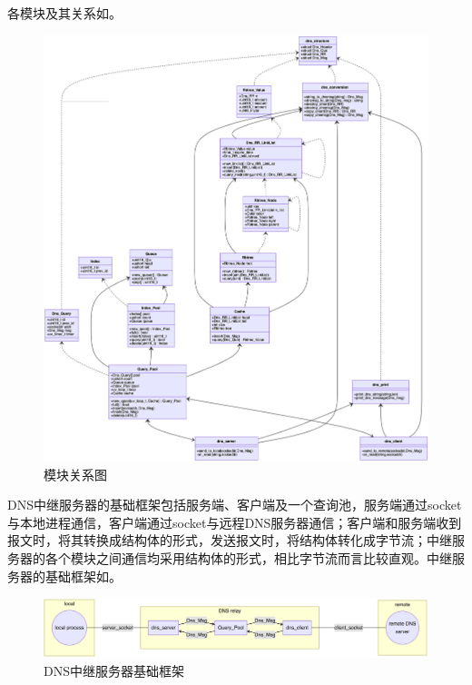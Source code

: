 \documentclass[lang=cn,11pt,a4paper,cite=authornum]{paper}
\begin{document}
各模块及其关系如。

\begin{figure}[htbp]

    \centering
    \includegraphics[width=\linewidth]{./Images/structure.png}
    \caption{模块关系图\label{fig:structure}}

\end{figure}

DNS中继服务器的基础框架包括服务端、客户端及一个查询池，服务端通过socket与本地进程通信，客户端通过socket与远程DNS服务器通信；客户端和服务端收到报文时，将其转换成结构体的形式，发送报文时，将结构体转化成字节流；中继服务器的各个模块之间通信均采用结构体的形式，相比字节流而言比较直观。中继服务器的基础框架如。

\begin{figure}[htbp]

    \centering
    \includegraphics[width=\linewidth]{./Images/structure2.png}
    \caption{DNS中继服务器基础框架\label{fig:structure2}}

\end{figure}
\end{document}
